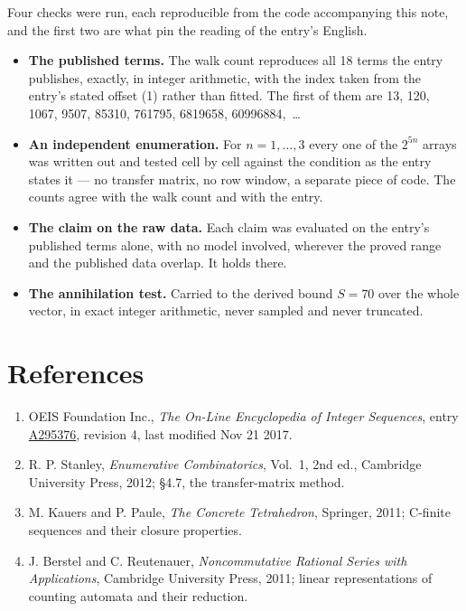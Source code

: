 \documentclass[11pt]{article}
\theoremstyle{definition}
\begin{document}
Four checks were run, each reproducible from the code accompanying this note, and the first two are what pin the reading of the entry's English.

\begin{itemize}

\item {\bfseries The published terms.} The walk count reproduces all 18 terms the entry publishes, exactly, in integer arithmetic, with the index taken from the entry's stated offset (1) rather than fitted. The first of them are 13, 120, 1067, 9507, 85310, 761795, 6819658, 60996884,~\dots

\item {\bfseries An independent enumeration.} For $n = 1,\dots,3$ every one of the $2^{5n}$ arrays was written out and tested cell by cell against the condition as the entry states it --- no transfer matrix, no row window, a separate piece of code. The counts agree with the walk count and with the entry.

\item {\bfseries The claim on the raw data.} Each claim was evaluated on the entry's published terms alone, with no model involved, wherever the proved range and the published data overlap. It holds there.

\item {\bfseries The annihilation test.} Carried to the derived bound $S = 70$ over the whole vector, in exact integer arithmetic, never sampled and never truncated.

\end{itemize}

\section{References}

\begin{enumerate}

\item OEIS Foundation Inc., \emph{The On-Line Encyclopedia of Integer Sequences}, entry \href{https://oeis.org/A295376}{A295376}, revision 4, last modified Nov 21 2017.

\item R. P. Stanley, \emph{Enumerative Combinatorics}, Vol.~1, 2nd ed., Cambridge University Press, 2012; \S4.7, the transfer-matrix method.

\item M. Kauers and P. Paule, \emph{The Concrete Tetrahedron}, Springer, 2011; C-finite sequences and their closure properties.

\item J. Berstel and C. Reutenauer, \emph{Noncommutative Rational Series with Applications}, Cambridge University Press, 2011; linear representations of counting automata and their reduction.

\end{enumerate}
\end{document}
